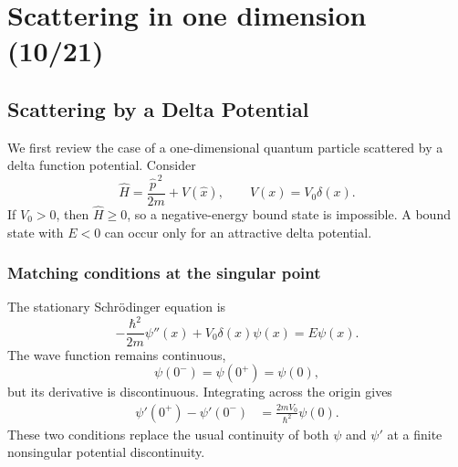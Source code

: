\section{Scattering in one dimension (10/21)}


\subsection{Scattering by a Delta Potential}

We first review the case of a one-dimensional quantum particle scattered by a delta function potential. Consider
\begin{equation}
 \hat H=\frac{\hat p^{\,2}}{2m}+V(\hat x),
 \qquad
 V(x)=V_0\delta(x).
\end{equation}
If $V_0>0$, then $\hat H\geq0$, so a negative-energy bound state is
impossible. A bound state with $E<0$ can occur only for an attractive delta
potential. 

\subsubsection{Matching conditions at the singular point}
The stationary Schr\"odinger equation is
\begin{equation}
 -\frac{\hbar^2}{2m}\psi''(x)+V_0\delta(x)\psi(x)=E\psi(x).
\end{equation}
The wave function remains continuous,
\begin{equation}
 \psi(0^-)=\psi(0^+)=\psi(0),
\end{equation}
but its derivative is discontinuous. Integrating across the origin gives
\begin{align}
 \psi'(0^+)-\psi'(0^-)
 &=\frac{2mV_0}{\hbar^2}\psi(0).
\end{align}
These two conditions replace the usual continuity of both $\psi$ and
$\psi'$ at a finite nonsingular potential discontinuity.


